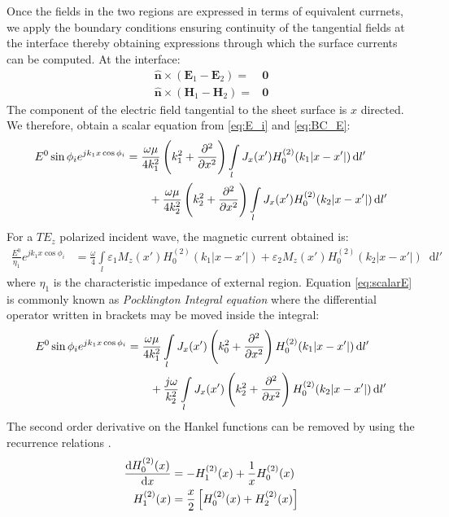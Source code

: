 \documentclass[11pt]{article}
\renewcommand{\v}[1]{\mathbf{#1}} %
\renewcommand{\O}{\omega}  %
\newcommand{\E}{\varepsilon}  %
\renewcommand{\u}{\mu}  %
\newcommand{\x}{\times}  %
\renewcommand{\^}{\hat}  %
\newcommand*\diff{\mathop{}\!\mathrm{d}} %
\begin{document}
Once the fields in the two regions are expressed in terms of equivalent currnets, we apply the boundary conditions ensuring continuity of the tangential fields at the interface thereby obtaining expressions through which the surface currents can be computed. At the interface:
%
\begin{subequations}
  \begin{align}
    \hat{\v n} \x (\v E_1 - \v E_2) ={}& \v 0
    \label{eq:BC_E}\\
    \hat{\v n} \x (\v H_1 - \v H_2) ={}& \v 0
    \label{eq:BC_H}
  \end{align}
  \label{eq:BC}
\end{subequations}
%
The component of the electric field tangential to the sheet surface is $x$ directed. We therefore, obtain a scalar equation from \eqref{eq:E_i} and \eqref{eq:BC_E}:
%
\begin{align}
  E^0 \sin \phi_i  e^{j k_1 x \cos \phi_i} &=  \frac{\O \u}{4 k_1^2}\left(k_1^2 +  \pdv[2]{}{x} \right) \int\limits_{l} J_x(x') H_0^{(2)}(k_1 |x - x'|) \diff{l'} \notag\\
    &\qquad + \frac{\O \u}{4 k_2^2}\left(k_2^2 +  \pdv[2]{}{x} \right) \int\limits_{l} J_x(x') H_0^{(2)}(k_2 |x - x'|) \diff{l'}
  \label{eq:scalarE}
\end{align}
%
For a $TE_z$ polarized incident wave, the magnetic current obtained is:
%
\begin{align}
  \frac{E^0}{\eta_1} e^{j k_1 x \cos \phi_i} &=  \frac{\O}{4} \int\limits_{l} \E_1 M_z(x') H_0^{(2)}(k_1 |x - x'|)  +  \E_2 M_z(x') H_0^{(2)}(k_2 |x - x'|) \diff{l'}
  \label{eq:scalarH}
\end{align}
%
where $\eta_1$ is the characteristic impedance of external region. Equation  \eqref{eq:scalarE} is commonly known as \emph{Pocklington Integral equation} where the differential operator written in brackets may be moved inside the integral:
%
\begin{align}
  E^0 \sin \phi_i  e^{j k_1 x \cos \phi_i}  &=  \frac{\O \u}{4 k_1^2} \int\limits_{l} J_x(x') \left(k_0^2 +  \pdv[2]{}{x} \right) H_0^{(2)}(k_1 |x - x'|) \diff{l'} \notag\\
  &\qquad + \frac{j \O}{k_2^2} \int\limits_{l} J_x(x') \left(k_2^2 +  \pdv[2]{}{x} \right) H_0^{(2)}(k_2 |x - x'|) \diff{l'}
  \label{eq:scalarE_pock}
\end{align}
%
The second order derivative on the Hankel functions can be removed by using the recurrence relations \cite[p. 361]{}.
%
\begin{subequations}
  \begin{align}
    \dv{H_0^{(2)}(x)}{x} &= -H_{1}^{(2)}(x) + \frac{1}{x} H_0^{(2)}(x)
    \label{eq:Hankel_ID1}\\
    H_{1}^{(2)}(x)  &= \frac{x}{2} \left[H_{0}^{(2)}(x) + H_{2}^{(2)}(x)\right]
    \label{eq:Hankel_ID2}
  \end{align}
  \label{eq:Hankel_ID}
\end{subequations}
\end{document}
